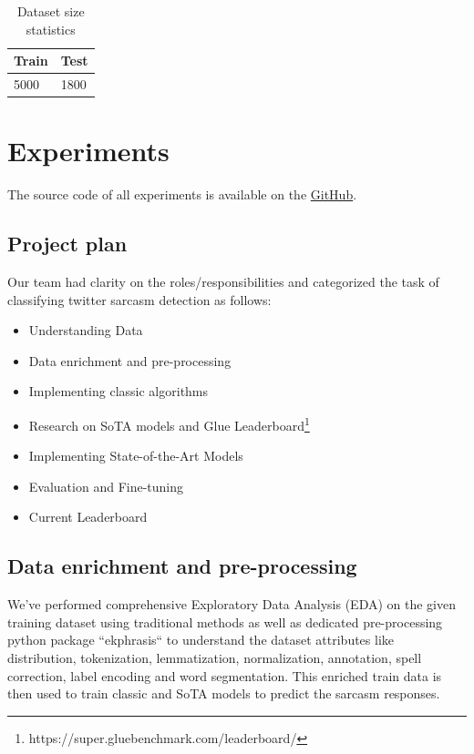 \documentclass[conference]{IEEEtran}
\begin{document}
\begin{table}[htbp]
\caption{Dataset size statistics}
\begin{center}
\begin{tabular}{|l|l|}
\hline
\textbf{Train} & \textbf{Test} \\ \hline
5000 & 1800          \\ \hline
\end{tabular}
\label{tab1}
\end{center}
\end{table}

\section{Experiments}
The source code of all experiments is available on the \href{https://github.com/dheerajpatta/CourseProject}{GitHub}.

\subsection{Project plan}

Our team had clarity on the roles/responsibilities and categorized the task of classifying twitter sarcasm detection as follows:

\begin{itemize}
	\item Understanding Data
	\item Data enrichment and pre-processing
	\item Implementing classic algorithms
	\item Research on SoTA models and Glue Leaderboard\footnote{https://super.gluebenchmark.com/leaderboard/}
	\item Implementing State-of-the-Art Models
	\item Evaluation and Fine-tuning
	\item Current Leaderboard
\end{itemize}

\subsection{Data enrichment and pre-processing}
We’ve performed comprehensive Exploratory Data Analysis (EDA) on the given training dataset using traditional methods as well as dedicated pre-processing python package ``ekphrasis`` to understand the dataset attributes like distribution, tokenization, lemmatization, normalization, annotation, spell correction, label encoding and word segmentation. This enriched train data is then used to train classic and SoTA models to predict the sarcasm responses. 
\end{document}
